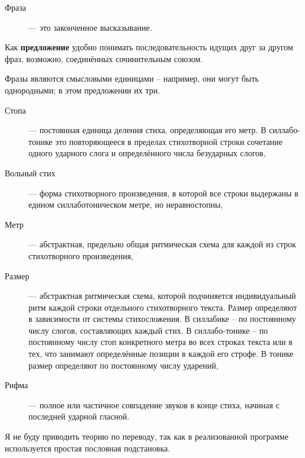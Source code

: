 \begin{description}
\item[Фраза] --- это законченное высказывание.
\end{description}

Как \textbf{предложение} удобно понимать последовательность идущих друг за другом фраз, возможно, соединённых сочинительным союзом.

Фразы являются смысловыми единицами -- например, они могут быть однородными; в этом предложении их три.

\bigskip

\begin{description}
\item[Стопа] --- постоянная единица деления стиха, определяющая его метр. В силлабо-тонике это повторяющееся в пределах стихотворной строки сочетание одного ударного слога и определённого числа безударных слогов, \cite{literature-rosman}
\item[Вольный стих] --- форма стихотворного произведения, в которой все строки выдержаны в едином силлаботоническом метре, но неравностопны, \cite{literature-rosman}
\item[Метр] --- абстрактная, предельно общая ритмическая схема для каждой из строк стихотворного произведения, \cite{literature-rosman}
\item[Размер] --- абстрактная ритмическая схема, которой подчиняется индивидуальный ритм каждой строки отдельного стихотворного текста. Размер определяют в зависимости от системы стихосложения. В силлабике – по постоянному числу слогов, составляющих каждый стих. В силлабо-тонике – по постоянному числу стоп конкретного метра во всех строках текста или в тех, что занимают определённые позиции в каждой его строфе. В тонике размер определяют по постоянному числу ударений, \cite{literature-rosman}
\item[Рифма] --- полное или частичное совпадение звуков в конце стиха, начиная с последней ударной гласной.
\end{description}

Я не буду приводить теорию по переводу, так как в реализованной программе используется простая пословная подстановка.